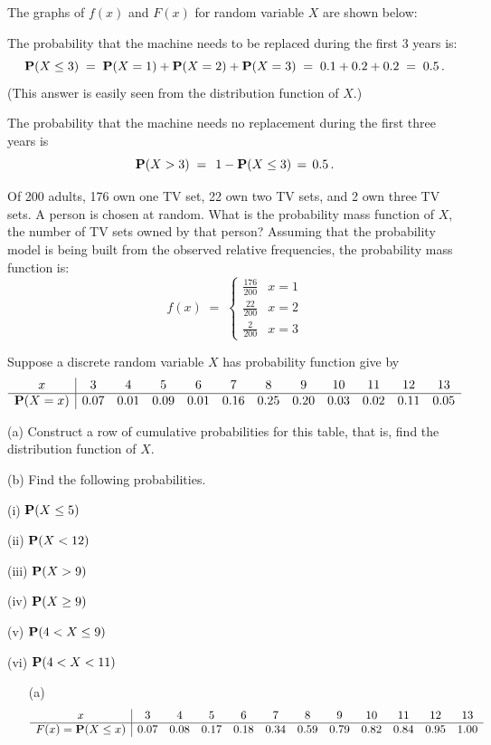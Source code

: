 \begin{ExerciseList}
The graphs of $f(x)$ and $F(x)$ for random variable $X$ are shown below:




\item The probability that the machine needs to be replaced during the
  first 3 years is:
$$\mathbf{P}(X \leq  3)\;=\;\mathbf{P}(X=1)+\mathbf{P}(X=2)+\mathbf{P}(X=3)\;=\;0.1+0.2+0.2\;=\;0.5\,.$$
(This answer is easily seen  from the distribution function of $X$.)
\item The probability that the machine needs no replacement during the
first three years is
\[ \mathbf{P}(X >  3)\;=\;\, 1-\mathbf{P}(X \leq  3)\,=\, 0.5 \,.\]
\ee

\Exercise
Of 200 adults, 176 own one TV set, 22 own two TV sets, and 2 own three TV sets.  
A person is chosen at random. What is the probability mass function of $X$,  the number of TV sets owned by that person?
\Answer
Assuming that the probability model is being built from the observed relative frequencies, the probability mass function is:
$$
f(x)\;=\;\begin{cases}\frac{176}{200}&x=1\\\frac{22}{200}&x=2\\\frac{2}{200}&x=3\end{cases}$$

\Exercise
Suppose a discrete random variable $X$ has probability function give by
$$\begin{array}{c|cccccccccccc}
x&3&4&5&6&7&8&9&10&11&12&13\\\hline
 \mathbf{P}(X=x)&0.07&0.01&0.09&0.01&0.16&0.25&0.20&0.03&0.02&0.11&0.05
\end{array}
$$
\be
\item[(a)] Construct a row of cumulative probabilities for this table, that
  is, find the distribution function of $X$.
\item[(b)] Find  the following  probabilities.
\be
\item[(i)]$\mathbf{P}(X\leq 5)$
\item[(ii)] $\mathbf{P}(X<12)$
\item[(iii)] $\mathbf{P}(X>9)$
\item[(iv)] $\mathbf{P}(X\geq 9)$
\item[(v)] $\mathbf{P}(4 <  X\leq 9)$
\item[(vi)] $\mathbf{P}(4<X<11)$
\ee
\ecols
\ee

\Answer
\begin{itemize}
\item[(a)]  $$\begin{array}{c|cccccccccccc}
x&3&4&5&6&7&8&9&10&11&12&13\\\hline
F(x) =\mathbf{P}(X\leq x)&0.07&0.08&0.17&0.18&0.34&0.59&0.79&0.82&0.84&0.95&1.00
\end{array}
$$


\end{itemize}
\end{ExerciseList}
